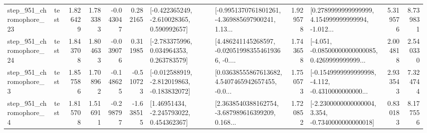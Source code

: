 \begin{tabular}{llrrrrllrlrr}
  step\_951\_chromophore\_23 &      test &      1.826429 &    1.783383 &     -0.043047 &  0.282165 &   [-0.422365249, -2.610028365, 0.590992657] &  [-0.9951370761801261, -4.369885697900241, 1.13... &       1.929578 &  [0.2789999999999999, 4.154999999999994, -1.012... &            5.319576 &          8.739831 \\
  step\_951\_chromophore\_24 &      test &      1.843708 &    1.804633 &     -0.039076 &  0.311985 &    [-2.783375996, 0.034964353, 0.263783579] &  [4.486241145268597, -0.020519983554619366, -0.... &       1.743658 &  [-4.051, -0.08500000000000085, 0.4269999999999... &            2.004818 &          2.540330 \\
   step\_951\_chromophore\_3 &      test &      1.857586 &    1.708962 &     -0.148625 & -0.510723 &  [-0.012588919, -2.812019863, -0.183832072] &  [0.03638555867613682, 4.5407465942657455, -0.0... &       1.750573 &  [-0.1549999999999998, -4.112, -0.4310000000000... &            2.933543 &          7.324744 \\
   step\_951\_chromophore\_4 &      test &      1.815708 &    1.516911 &     -0.298797 & -1.638515 &     [1.46951434, -2.245793022, 0.454362367] &  [2.3638540388162754, -3.687989616399209, 0.168... &       1.720852 &  [-2.2300000000000004, 3.354, -0.7340000000000018] &            0.830183 &          8.177556 \\
\bottomrule
\end{tabular}

